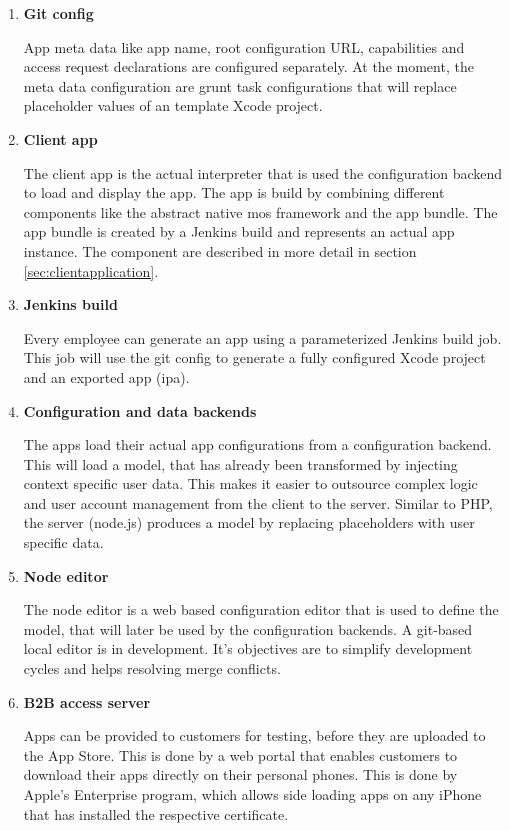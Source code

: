 \begin{enumerate}
	\item \textbf{Git config}
	
	App meta data like app name, root configuration \ac{URL}, capabilities and access request declarations are configured separately.
	At the moment, the meta data configuration are grunt task configurations that will replace placeholder values of an template Xcode project.
	
	\item \textbf{Client app}
	
	The client app is the actual interpreter that is used the configuration backend to load and display the app.
	The app is build by combining different components like the abstract native mos framework and the app bundle.
	The app bundle is created by a Jenkins build and represents an actual app instance.
	The component are described in more detail in section \ref{sec:clientapplication}.
	
	\item \textbf{Jenkins build}
	
	Every employee can generate an app using a parameterized Jenkins build job.
	This job will use the git config to generate a fully configured Xcode project and an exported app (\ac{ipa}).
	
	\item \textbf{Configuration and data backends}
	
	The apps load their actual app configurations from a configuration backend.
	This will load a model, that has already been transformed by injecting context specific user data.
	This makes it easier to outsource complex logic and user account management from the client to the server.
	Similar to \ac{PHP}, the server (node.js) produces a model by replacing placeholders with user specific data.
	
	\item \textbf{Node editor}
	
	The node editor is a web based configuration editor that is used to define the model, that will later be used by the configuration backends.
	A git-based local editor is in development.
	It's objectives are to simplify development cycles and helps resolving merge conflicts.
	
	\item \textbf{B2B access server}
	
	Apps can be provided to customers for testing, before they are uploaded to the App Store.
	This is done by a web portal that enables customers to download their apps directly on their personal phones.
	This is done by Apple's Enterprise program, which allows side loading apps on any iPhone that has installed the respective certificate.
\end{enumerate}



